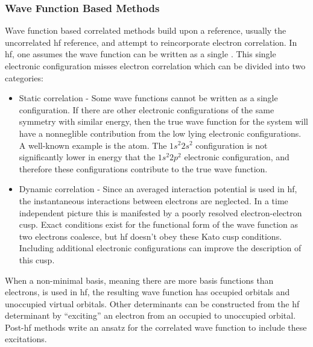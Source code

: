 \subsubsection{Wave Function Based Methods}
Wave function based correlated methods build upon a reference, usually the uncorrelated \gls{hf} reference, and attempt to reincorporate electron correlation.
In \gls{hf}, one assumes the wave function can be written as a single .
This single electronic configuration misses electron correlation which can be divided into two categories:
\begin{itemize}
\item Static correlation - Some wave functions cannot be written as a single configuration. If there are other electronic configurations of the same symmetry with similar energy, then the true wave function for the system will have a nonneglible contribution from the low lying electronic configurations. A well-known example is the  atom. The $1s^2 2s^2$ configuration is not significantly lower in energy that the $1s^2 2p^2$ electronic configuration, and therefore these configurations contribute to the true wave function.\cite{10.1063/1.1669638, 10.1103/PhysRevA.4.908, 10.1103/PhysRevA.14.1965, 10.1103/PhysRevA.65.042507, 10.1063/1.477970}

\item Dynamic correlation - Since an averaged interaction potential is used in \gls{hf}, the instantaneous interactions between electrons are neglected. In a time independent picture this is manifested by a poorly resolved electron-electron cusp. Exact conditions exist for the functional form of the wave function as two electrons coalesce, but \gls{hf} doesn't obey these Kato cusp conditions.\cite{10.1002/cpa.3160100201} Including additional electronic configurations can improve the description of this cusp.
\end{itemize}

When a non-minimal basis, meaning there are more basis functions than electrons, is used in \gls{hf}, the resulting wave function has occupied orbitals and unoccupied virtual orbitals.
Other determinants can be constructed from the \gls{hf} determinant by ``exciting'' an electron from an occupied to unoccupied orbital.
Post-\gls{hf} methods write an ansatz for the correlated wave function to include these excitations.

